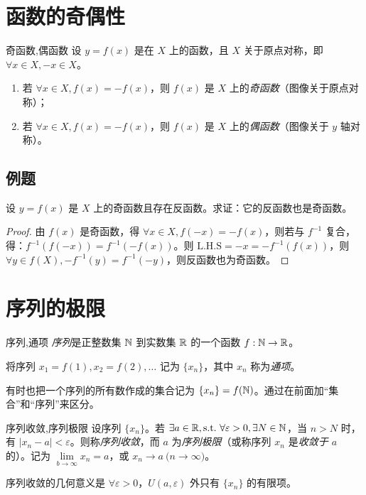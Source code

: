 
\section{函数的奇偶性}

\begin{definition}{奇函数,偶函数}
	设 $y = f(x)$ 是在 $X$ 上的函数，且 $X$ 关于原点对称，即 $\forall x \in X, -x \in X$。

	\begin{enumerate}
		\item 若 $\forall x \in X, f(x) = -f(x)$，则 $f(x)$ 是 $X$ 上的\emph{奇函数}（图像关于原点对称）；
		\item 若 $\forall x \in X, f(x) = -f(x)$，则 $f(x)$ 是 $X$ 上的\emph{偶函数}（图像关于 $y$ 轴对称）。
	\end{enumerate}
\end{definition}

\subsection{例题}

设 $y = f(x)$ 是 $X$ 上的奇函数且存在反函数。求证：它的反函数也是奇函数。

\begin{proof}
	由 $f(x)$ 是奇函数，得 $\forall x \in X, f(-x) = -f(x)$，则若与 $f^{-1}$ 复合，得：$f^{-1}(f(-x)) = f^{-1}(-f(x))$。则 $\text{L.H.S} = -x = -f^{-1}(f(x))$，则 $\forall y \in f(X), -f^{-1}(y) = f^{-1}(-y)$，则反函数也为奇函数。
\end{proof}

\section{序列的极限}

\begin{definition}{序列,通项}
	\emph{序列}是正整数集 $\mathbb N$ 到实数集 $\mathbb R$ 的一个函数 $f: \mathbb N \rightarrow \mathbb R$。

	将序列 $x_1 = f(1), x_2 = f(2), \ldots$ 记为 $\{x_n\}$，其中 $x_n$ 称为\emph{通项}。
\end{definition}

有时也把一个序列的所有数作成的集合记为 $\{x_n\} = f(\mathbb N)$。通过在前面加“集合”和“序列”来区分。

\begin{definition}{序列收敛,序列极限}
	设序列 $\{x_n\}$。若 $\exists a \in \mathbb R, \text{s.t.~} \forall \varepsilon > 0, \exists N \in \mathbb N$，当 $n > N$ 时，有 $|x_n - a| < \varepsilon$。则称\emph{序列收敛}，而 $a$ 为\emph{序列极限}（或称序列 $x_n$ 是\emph{收敛于 $a$} 的）。记为 $\lim\limits_{b \rightarrow \infty} x_n = a$，或 $x_n \rightarrow a\pod{n \rightarrow \infty}$。

	序列收敛的几何意义是 $\forall \varepsilon > 0$，$U(a, \varepsilon)$ 外只有 $\{x_n\}$ 的有限项。
\end{definition}

